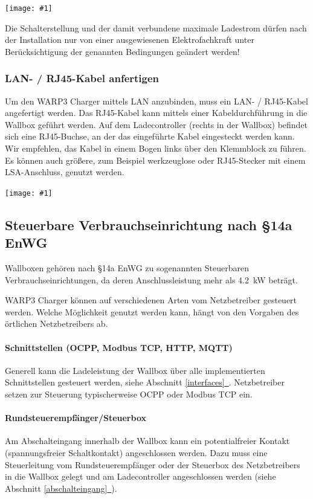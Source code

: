 \documentclass[a4paper,10pt]{article}
\newcommand{\hint}[1]{\begin{tcolorbox}[colback=boxgray,colframe=black,coltext=
white,title=Hinweis,left*=2mm,right*=2mm,boxsep=1mm,bottom=1mm,top=1mm]#1\end{tcolorbox}}
\newcommand{\gfx}[1]{\texttt{[image: \#1]}}
\newcommand*{\fullref}[1]{Abschnitt \hyperref[{#1}]{\ref*{#1}~\nameref*{#1}}}
\begin{document}
\begin{multicols*}{2}
    \gfx{./img_warp3/resized/warp3_switches.jpg}

    \hint{Die Schalterstellung und der damit verbundene maximale Ladestrom dürfen nach der
          Installation nur von einer ausgewiesenen Elektrofachkraft unter
          Berücksichtigung der genannten Bedingungen geändert werden!}

    \subsubsection{LAN- / RJ45-Kabel anfertigen}\label{ethernet}

    Um den WARP3 Charger mittels LAN anzubinden, muss ein LAN- / RJ45-Kabel
    angefertigt werden. Das RJ45-Kabel kann mittels einer
    Kabeldurchführung in die Wallbox geführt werden. Auf dem Ladecontroller
	(rechts in der Wallbox) befindet sich eine RJ45-Buchse, an der das
	eingeführte Kabel eingesteckt werden kann. Wir empfehlen, das Kabel
	in einem Bogen links über den Klemmblock zu führen.
	Es können auch größere, zum Beispiel werkzeuglose oder RJ45-Stecker
	mit einem LSA-Anschluss, genutzt werden.

    \gfx{./img_warp3/resized/warp3_pro_open_highlighted_LAN.jpg} %

    \subsection{Steuerbare Verbrauchseinrichtung nach \S14a EnWG}\label{s14enwg}
    Wallboxen gehören nach \S14a EnWG zu sogenannten Steuerbaren
    Verbrauchseinrichtungen, da deren Anschlussleistung mehr als \SI{4,2}{\kilo\watt} beträgt.

    WARP3 Charger können auf verschiedenen Arten vom Netzbetreiber gesteuert werden.
    Welche Möglichkeit genutzt werden kann, hängt von den Vorgaben des örtlichen Netzbetreibers ab.

    \paragraph*{Schnittstellen (OCPP, Modbus TCP, HTTP, MQTT)}
    Generell kann die Ladeleistung der Wallbox über alle implementierten Schnittstellen gesteuert werden, siehe \fullref{interfaces}.
    Netzbetreiber setzen zur Steuerung typischerweise OCPP oder Modbus TCP ein.

    \paragraph*{Rundsteuerempfänger/Steuerbox}
    Am Abschalteingang innerhalb der Wallbox kann ein potentialfreier Kontakt (spannungsfreier Schaltkontakt)
    angeschlossen werden. Dazu muss eine Steuerleitung vom Rundsteuerempfänger
    oder der Steuerbox des Netzbetreibers in die Wallbox gelegt und am
	Ladecontroller angeschlossen werden (siehe \fullref{abschalteingang}).


\end{multicols*}
\end{document}
